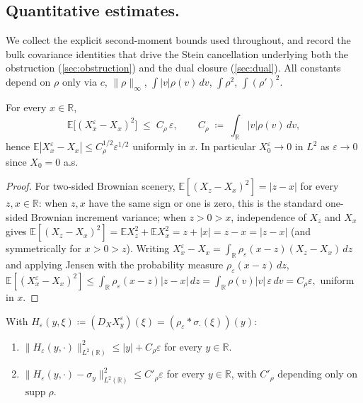 \documentclass[EJP]{ejpecp}
\newcommand{\R}{\mathbb{R}}
\renewcommand{\E}{\mathbb{E}}
\DeclareMathOperator{\supp}{supp}
\begin{document}
\subsection*{Quantitative estimates.}
We collect the explicit second-moment bounds used throughout, and
record the bulk covariance identities that drive the Stein
cancellation underlying both the obstruction (\cref{sec:obstruction})
and the dual closure (\cref{sec:dual}). All constants depend on
$\rho$ only via $c$, $\|\rho\|_\infty$, $\int|v|\rho(v)\,dv$,
$\int\rho^{2}$, $\int(\rho')^{2}$.

\begin{lemma}
\label{lem:moll-rate}
For every $x\in\R$,
\begin{equation}\label{eq:moll-rate-L2}
  \E\bigl[(X^{\varepsilon}_x-X_x)^{2}\bigr]\;\le\;C_\rho\,\varepsilon,
  \qquad C_\rho\;\coloneqq\;\int_\R|v|\rho(v)\,dv,
\end{equation}
hence $\E|X^\varepsilon_x-X_x|\le C_\rho^{1/2}\varepsilon^{1/2}$
uniformly in $x$. In particular $X^\varepsilon_0\to 0$ in $L^{2}$ as
$\varepsilon\to 0$ since $X_0=0$ a.s.
\end{lemma}

\begin{proof}
For two-sided Brownian scenery, $\E[(X_z-X_x)^{2}]=|z-x|$ for every
$z,x\in\R$: when $z,x$ have the same sign or one is zero, this is
the standard one-sided Brownian increment variance; when $z>0>x$,
independence of $X_z$ and $X_x$ gives
$\E[(X_z-X_x)^{2}]=\E X_z^{2}+\E X_x^{2}=z+|x|=z-x=|z-x|$ (and
symmetrically for $x>0>z$). Writing
$X^\varepsilon_x-X_x=\int_\R\rho_\varepsilon(x-z)(X_z-X_x)\,dz$ and
applying Jensen with the probability measure
$\rho_\varepsilon(x-z)\,dz$,
\(
  \E[(X^\varepsilon_x-X_x)^{2}]
  \le\int_\R\rho_\varepsilon(x-z)|z-x|\,dz
  =\int_\R\rho(v)|v|\,\varepsilon\,dv=C_\rho\varepsilon,
\)
uniform in $x$.
\end{proof}

\begin{lemma}
\label{lem:moll-H}
With $H_\varepsilon(y,\xi)\coloneqq(D_X X^\varepsilon_y)(\xi)
=(\rho_\varepsilon*\sigma_\cdot(\xi))(y)$:
\begin{enumerate}
\item[(a)] $\|H_\varepsilon(y,\cdot)\|_{L^{2}(\R)}^{2}\le|y|+C_\rho\varepsilon$
  for every $y\in\R$.
\item[(b)] $\|H_\varepsilon(y,\cdot)-\sigma_y\|_{L^{2}(\R)}^{2}\le C'_\rho\varepsilon$
  for every $y\in\R$, with $C'_\rho$ depending only on $\supp\rho$.
\end{enumerate}
\end{lemma}
\end{document}
